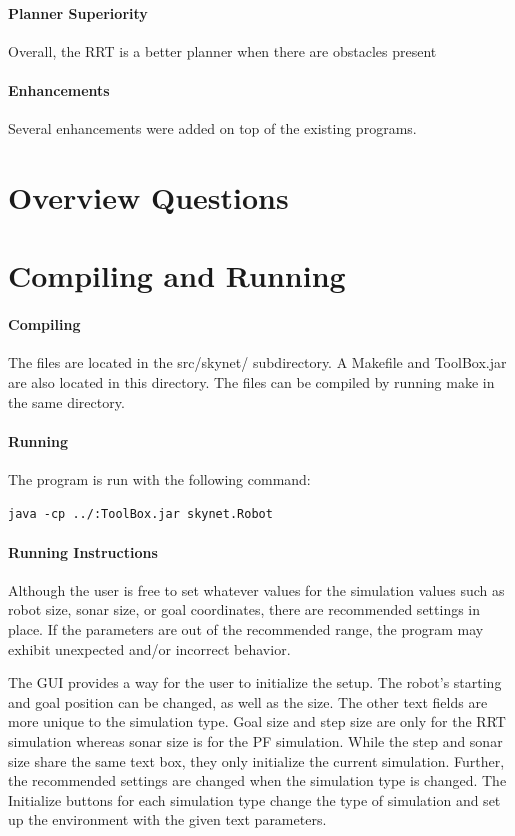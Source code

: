 \documentclass[12pt]{article}
\begin{document}
\paragraph*{Planner Superiority}
Overall, the RRT is a better planner when there are obstacles present
\paragraph*{Enhancements}
Several enhancements were added on top of the existing programs. 

\section{Overview Questions}

\section{Compiling and Running}
\paragraph*{Compiling}
The files are located in the src/skynet/ subdirectory. A Makefile and ToolBox.jar are also located in this directory. The files can be compiled by running make in the same directory. 
\paragraph*{Running}
The program is run with the following command:
\begin{lstlisting}
java -cp ../:ToolBox.jar skynet.Robot
\end{lstlisting}
\paragraph*{Running Instructions}
Although the user is free to set whatever values for the simulation values such as robot size, sonar size, or goal coordinates, there are recommended settings in place. If the parameters are out of the recommended range, the program may exhibit unexpected and/or incorrect behavior.

The GUI provides a way for the user to initialize the setup. The robot's starting and goal position can be changed, as well as the size. The other text fields are more unique to the simulation type. Goal size and step size are only for the RRT simulation whereas sonar size is for the PF simulation. While the step and sonar size share the same text box, they only initialize the current simulation. Further, the recommended settings are changed when the simulation type is changed. The Initialize buttons for each simulation type change the type of simulation and set up the environment with the given text parameters. 
\end{document}

